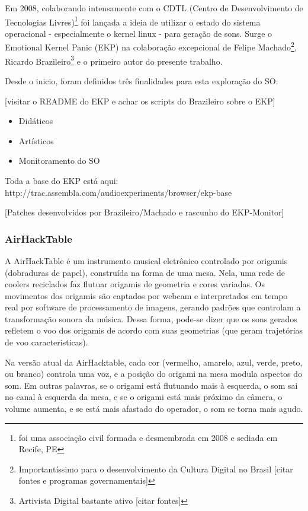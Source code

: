 Em 2008, colaborando intensamente com o CDTL
(Centro de Desenvolvimento de Tecnologias Livres)\footnote{foi uma associação civil formada e desmembrada em 2008 e sediada em Recife, PE}
foi lançada a ideia de utilizar o estado do sistema operacional - especialmente o kernel linux - para
geração de sons. Surge o Emotional Kernel Panic (EKP) na colaboração excepcional de
Felipe Machado\footnote{Importantíssimo para o desenvolvimento da Cultura Digital no Brasil [citar fontes e programas governamentais]},
Ricardo Brazileiro\footnote{Artivista Digital bastante ativo [citar fontes]} e o primeiro autor do presente trabalho.

Desde o inicio, foram definidos três finalidades
para esta exploração do SO:

[visitar o README do EKP e achar os scripts do Brazileiro sobre o EKP]

\begin{itemize}
    \item Didáticos
    \item Artísticos
    \item Monitoramento do SO
\end{itemize}

Toda a base do EKP está aqui: http://trac.assembla.com/audioexperiments/browser/ekp-base

[Patches desenvolvidos por Brazileiro/Machado e rascunho do EKP-Monitor]

      \subsubsection{AirHackTable}

A AirHackTable é um instrumento musical eletrônico controlado por origamis (dobraduras de papel), construída na forma de uma mesa. Nela, uma rede de coolers reciclados faz flutuar origamis de geometria e cores variadas. Os movimentos dos origamis são captados por webcam e interpretados em tempo real por software de processamento de imagens, gerando padrões que controlam a transformação sonora da música. Dessa forma, pode-se dizer que os sons gerados refletem o voo dos origamis de acordo com suas geometrias (que geram trajetórias de voo caracteristicas).

Na versão atual da AirHacktable, cada cor (vermelho, amarelo, azul, verde, preto, ou branco) controla uma voz, e a posição do origami na mesa modula aspectos do som. Em outras palavras, se o origami está flutuando mais à esquerda, o som sai no canal à esquerda da mesa, e se o origami está mais próximo da câmera, o volume aumenta, e se está mais afastado do operador, o som se torna mais agudo. 


